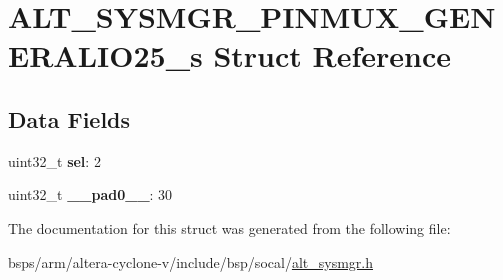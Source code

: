 \hypertarget{structALT__SYSMGR__PINMUX__GENERALIO25__s}{}\section{A\+L\+T\+\_\+\+S\+Y\+S\+M\+G\+R\+\_\+\+P\+I\+N\+M\+U\+X\+\_\+\+G\+E\+N\+E\+R\+A\+L\+I\+O25\+\_\+s Struct Reference}
\label{structALT__SYSMGR__PINMUX__GENERALIO25__s}
\subsection*{Data Fields}
\begin{DoxyCompactItemize}
\item 
\mbox{\label{structALT__SYSMGR__PINMUX__GENERALIO25__s_a8fe0267c080a2871251fe8482301fd66}} 
uint32\+\_\+t {\bfseries sel}\+: 2
\item 
\mbox{\label{structALT__SYSMGR__PINMUX__GENERALIO25__s_a41721a2ed36942f81aa4e55bebd1cd05}} 
uint32\+\_\+t {\bfseries \+\_\+\+\_\+pad0\+\_\+\+\_\+}\+: 30
\end{DoxyCompactItemize}


The documentation for this struct was generated from the following file\+:\begin{DoxyCompactItemize}
\item 
bsps/arm/altera-\/cyclone-\/v/include/bsp/socal/\mbox{\hyperlink{alt__sysmgr_8h}{alt\+\_\+sysmgr.\+h}}\end{DoxyCompactItemize}
